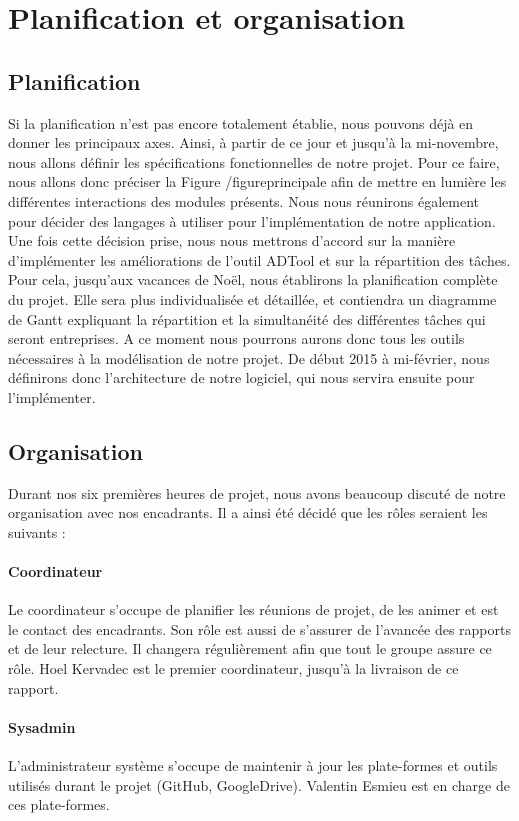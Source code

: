 \section{Planification et organisation}
	\subsection{Planification}
		Si la planification n'est pas encore totalement établie, nous pouvons déjà en donner les principaux axes.
		Ainsi, à partir de ce jour et jusqu'à la mi-novembre, nous allons définir les spécifications fonctionnelles de notre projet.
		Pour ce faire, nous allons donc préciser la Figure /figureprincipale afin de mettre en lumière les différentes interactions des modules présents. Nous nous réunirons également pour décider des langages à utiliser pour l'implémentation de notre application.
		Une fois cette décision prise, nous nous mettrons d'accord sur la manière d'implémenter les améliorations de l'outil ADTool et sur la répartition des tâches.
		Pour cela, jusqu'aux vacances de Noël, nous établirons la planification complète du projet. Elle sera plus individualisée et détaillée, et contiendra un diagramme de Gantt expliquant la répartition et la simultanéité des différentes tâches qui seront entreprises.
		A ce moment nous pourrons aurons donc tous les outils nécessaires à la modélisation de notre projet.
		De début 2015 à mi-février, nous définirons donc l'architecture de notre logiciel, qui nous servira ensuite pour l'implémenter.

	\subsection{Organisation}
	    Durant nos six premières heures de projet, nous avons beaucoup discuté de notre organisation avec nos encadrants. Il a ainsi été décidé que les rôles seraient les suivants :
	    \paragraph{Coordinateur} Le coordinateur s'occupe de planifier les réunions de projet, de les animer et est le contact des encadrants. Son rôle est aussi de s'assurer de l'avancée des rapports et de leur relecture. Il changera régulièrement afin que tout le groupe assure ce rôle. Hoel Kervadec est le premier coordinateur, jusqu'à la livraison de ce rapport.
	    \paragraph{Sysadmin} L'administrateur système s'occupe de maintenir à jour les plate-formes et outils utilisés durant le projet (GitHub, GoogleDrive). Valentin Esmieu est en charge de ces plate-formes.
